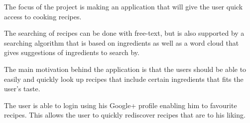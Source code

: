 The focus of the project is making an application that will give the user quick access to cooking recipes.

The searching of recipes can be done with free-text, but is also supported by a searching algorithm that is based on ingredients as well as a word cloud that gives suggestions of ingredients to search by.

The main motivation behind the application is that the users should be able to easily and quickly look up recipes that include certain ingredients that fits the user's taste.

The user is able to login using his Google+ profile enabling him to favourite recipes. This allows the user to quickly rediscover recipes that are to his liking.